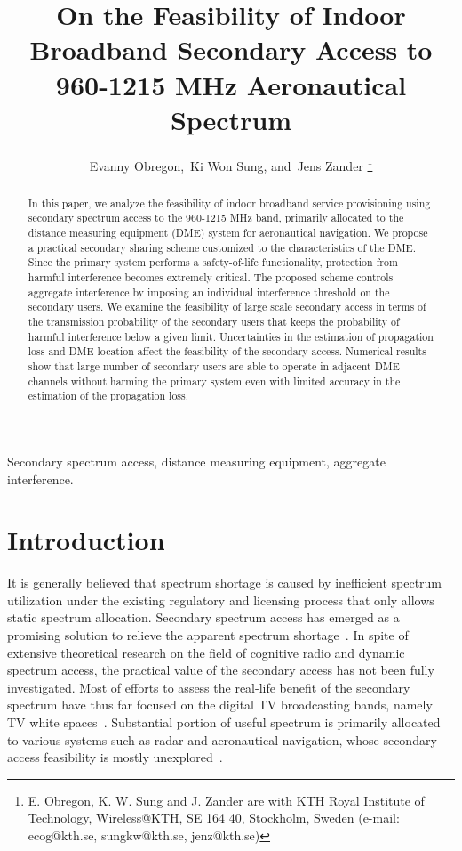 \documentclass[12pt,submission,journal,onecolumn]{IEEEtran}
\begin{document}
\title{On the Feasibility of Indoor Broadband Secondary Access to 960-1215 MHz Aeronautical Spectrum}

\author{Evanny Obregon,~Ki Won Sung, and~Jens Zander
\thanks{E. Obregon, K. W. Sung and J. Zander are with KTH Royal Institute of Technology, Wireless@KTH, SE 164 40, Stockholm, Sweden (e-mail: ecog@kth.se, sungkw@kth.se, jenz@kth.se)}
}
\maketitle
\begin{abstract}
In this paper, we analyze the feasibility of indoor broadband service provisioning using secondary spectrum access to the 960-1215 MHz band, primarily allocated to the distance measuring equipment (DME) system for aeronautical navigation. We propose a practical secondary sharing scheme customized to the characteristics of the DME. Since the primary system performs a safety-of-life functionality, protection from harmful interference becomes extremely critical. The proposed scheme controls aggregate interference by imposing an individual interference threshold on the secondary users. We examine the feasibility of large scale secondary access in terms of the transmission probability of the secondary users that keeps the probability of harmful interference below a given limit. Uncertainties in the estimation of propagation loss and DME location affect the feasibility of the secondary access. Numerical results show that large number of secondary users are able to operate in adjacent DME channels without harming the primary system even with limited accuracy in the estimation of the propagation loss.
\end{abstract}

\begin{IEEEkeywords}
Secondary spectrum access, distance measuring equipment, aggregate interference.
\end{IEEEkeywords}

\section{Introduction}
\label{sec:Introduction}

It is generally believed that spectrum shortage is caused by inefficient spectrum utilization under the existing regulatory and licensing process that only allows static spectrum allocation. Secondary spectrum access has emerged as a promising solution to relieve the apparent spectrum shortage~\cite{hskz1201}. In spite of extensive theoretical research on the field of cognitive radio and dynamic spectrum access, the practical value of the secondary access has not been fully investigated. Most of efforts to assess the real-life benefit of the secondary spectrum have thus far focused on the digital TV broadcasting bands, namely TV white spaces~\cite{hms1001,bram1201}. Substantial portion of useful spectrum is primarily allocated to various systems such as radar and aeronautical navigation, whose secondary access feasibility is mostly unexplored~\cite{hskz1201}.
\end{document}
